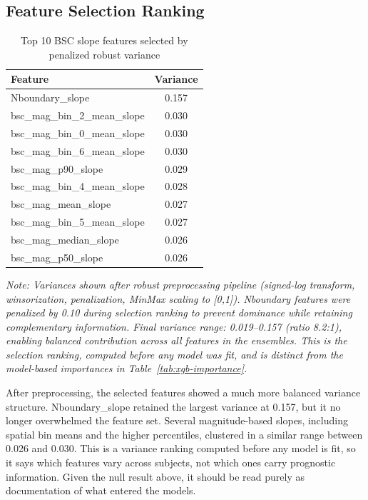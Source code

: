 \documentclass[blue]{ludusofficial}  %
\begin{document}
\subsection{Feature Selection Ranking}

\begin{table}[htbp]
\centering
\caption{Top 10 BSC slope features selected by penalized robust variance}
\label{tab:top-features}
\begin{tabular}{lc}
\hline
\textbf{Feature} & \textbf{Variance} \\
\hline
Nboundary\_slope & 0.157 \\
bsc\_mag\_bin\_2\_mean\_slope & 0.030 \\
bsc\_mag\_bin\_0\_mean\_slope & 0.030 \\
bsc\_mag\_bin\_6\_mean\_slope & 0.030 \\
bsc\_mag\_p90\_slope & 0.029 \\
bsc\_mag\_bin\_4\_mean\_slope & 0.028 \\
bsc\_mag\_mean\_slope & 0.027 \\
bsc\_mag\_bin\_5\_mean\_slope & 0.027 \\
bsc\_mag\_median\_slope & 0.026 \\
bsc\_mag\_p50\_slope & 0.026 \\
\hline
\end{tabular}
\end{table}

\textit{Note: Variances shown after robust preprocessing pipeline (signed-log transform, winsorization, penalization, MinMax scaling to [0,1]). Nboundary features were penalized by 0.10 during selection ranking to prevent dominance while retaining complementary information. Final variance range: 0.019--0.157 (ratio 8.2:1), enabling balanced contribution across all features in the ensembles. This is the selection ranking, computed before any model was fit, and is distinct from the model-based importances in Table~\ref{tab:xgb-importance}.}

After preprocessing, the selected features showed a much more balanced variance structure. Nboundary\_slope retained the largest variance at 0.157, but it no longer overwhelmed the feature set. Several magnitude-based slopes, including spatial bin means and the higher percentiles, clustered in a similar range between 0.026 and 0.030. This is a variance ranking computed before any model is fit, so it says which features vary across subjects, not which ones carry prognostic information. Given the null result above, it should be read purely as documentation of what entered the models.
\end{document}
